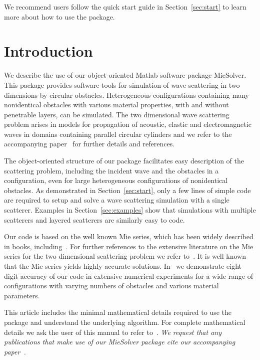 \documentclass[11pt,letterpaper]{article}
\begin{document}
We recommend users follow the quick start guide in Section~\ref{sec:start}
to learn more about how to use the package.

\tableofcontents




\section{Introduction}

We describe the use of our object-oriented Matlab software package
MieSolver.
This package provides software tools for simulation of wave scattering
in two dimensions
by circular obstacles.
Heterogeneous configurations containing many nonidentical 
obstacles with various material properties, with and without penetrable layers,
can be simulated.
The two dimensional wave scattering problem arises in models for propagation
of acoustic, elastic and electromagnetic waves in domains
containing parallel circular cylinders and we refer to the accompanying
paper~\cite{mietoms}
for further details and references.

The object-oriented structure of our package facilitates easy
description of the scattering problem,
including the incident wave and the
obstacles in a configuration, even for
large heterogeneous configurations of nonidentical obstacles.
As demonstrated in Section~\ref{sec:start}, only a few lines of simple
code are required to setup and solve a wave scattering simulation with a
single scatterer.
Examples in Section~\ref{sec:examples} show that simulations with multiple
scatterers and layered scatterers are similarly easy to code.

Our code is based on the well known Mie series,
which has been widely described in books,
including~\cite{bohren,rother,hulst:light}.
For further references to the extensive literature on the Mie series for
the two dimensional
scattering problem we refer to~\cite{mietoms}.
It is well known that the Mie series yields highly accurate solutions.
In~\cite{mietoms} we demonstrate eight digit accuracy of our code in 
extensive numerical experiments for a wide range of configurations with
varying numbers of obstacles and various material parameters.

This article includes the minimal mathematical details required to
use the package and understand
the underlying algorithm.
For complete mathematical details we ask the user of this manual
to refer to~\cite{mietoms}.
\textit{We request that any publications that make
  use of our MieSolver package cite
our accompanying paper~\cite{mietoms}.}
\end{document}
